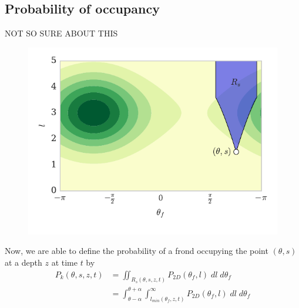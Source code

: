 \subsection{Probability of occupancy}
NOT SO SURE ABOUT THIS

\begin{figure}[H]
	\centering
	\includegraphics[width=\linewidth]{cart_shade}
	\vspace{-3em}
	\label{fig:cart_shade}
\end{figure}

Now, we are able to define the probability of a frond occupying the point $(\theta,s)$ at a depth $z$ at time $t$ by
\begin{align}
		P_k(\theta,s,z,t)	&= \iint_{R_s(\theta,s,z,t)}
								P_{2D}(\theta_f,l)
								\;dl\;d\theta_f \nonumber \\
							&= \int_{\theta-\alpha}^{\theta+\alpha} 
								\int_{l_{min}(\theta_f,z,t)}^\infty
								P_{2D}(\theta_f,l)
								\;dl\;d\theta_f
\end{align}

